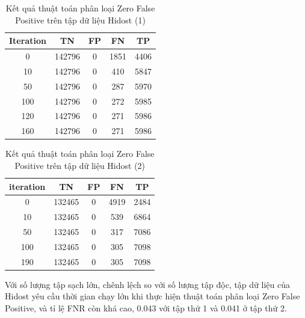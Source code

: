 \documentclass[./../main.tex]{subfiles}
\begin{document}
\begin{table}[]
	\centering
	\caption{Kết quả thuật toán phân loại Zero False Positive trên tập dữ liệu Hidost (1)}
	\label{tab:ket_qua_thuat_toan_phan_loai_hidost}
	\begin{tabular}{|c|c|c|c|c|}
		\hline
		\textbf{Iteration} & \textbf{TN} & \textbf{FP} & \textbf{FN} & \textbf{TP} \\ \hline
		0                  & 142796      & 0           & 1851        & 4406        \\ \hline
		10                 & 142796      & 0           & 410         & 5847        \\ \hline
		50                 & 142796      & 0           & 287         & 5970        \\ \hline
		100                & 142796      & 0           & 272         & 5985        \\ \hline
		120                & 142796      & 0           & 271         & 5986        \\ \hline
		160                & 142796      & 0           & 271         & 5986        \\ \hline
	\end{tabular}
\end{table}

\begin{table}[]
	\centering
	\caption{Kết quả thuật toán phân loại Zero False Positive trên tập dữ liệu Hidost (2)}
	\label{tab:ket_qua_thuat_toan_phan_loai_hidost_2}
	\begin{tabular}{|c|c|c|c|c|}
		\hline
		\textbf{iteration} & \textbf{TN} & \textbf{FP} & \textbf{FN} & \textbf{TP} \\ \hline
		0                  & 132465      & 0           & 4919        & 2484        \\ \hline
		10                 & 132465      & 0           & 539         & 6864        \\ \hline
		50                 & 132465      & 0           & 317         & 7086        \\ \hline
		100                & 132465      & 0           & 305         & 7098        \\ \hline
		190                & 132465      & 0           & 305         & 7098        \\ \hline
	\end{tabular}
\end{table}

Với số lượng tập sạch lớn, chênh lệch so với số lượng tập độc, tập dữ liệu của Hidost yêu cầu thời gian chạy lớn khi thực hiện thuật toán phân loại Zero False Positive, và tỉ lệ FNR còn khá cao, 0.043 với tập thứ 1 và 0.041 ở tập thứ 2.
\end{document}
